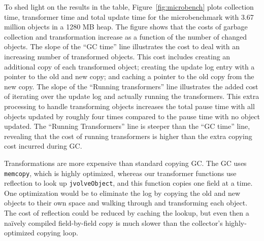 To shed light on the results in the table,
Figure~\ref{fig:microbench} plots collection time, transformer time and
total update time for the microbenchmark with 3.67 million objects in a
1280 MB heap.  The figure shows that the costs of garbage collection and
transformation increase  as a function of the number of changed objects.  The slope of the ``GC time'' line illustrates the cost to deal
with an increasing number of transformed objects.  This cost includes
creating an additional copy of each transformed object; creating the
update log entry with a pointer to the old and new copy; and caching a
pointer to the old copy from the new copy.  The slope of the
``Running transformers'' line illustrates the added cost of iterating
over the update log and actually running the transformers.  This extra
processing to handle transforming objects increases the total pause
time with all objects updated by roughly four times compared to the
pause time with no object updated.  The ``Running
Transformers'' line is steeper than the ``GC time'' line, revealing that
the cost of running transformers is higher than the extra copying cost
incurred during GC\@.

Transformations are more expensive than standard copying GC. The GC uses
\texttt{memcopy}, which is highly optimized, whereas our transformer
functions use reflection to look up \texttt{jvolveObject}, and this
function copies one field at a time.  One optimization would be to eliminate the log by copying
the old and new objects to their own space and %
walking through and transforming each object.
The cost of reflection could be
reduced by caching the lookup, but even then a na\"ively compiled
field-by-field copy is much slower than the collector's
highly-optimized copying loop.  %



